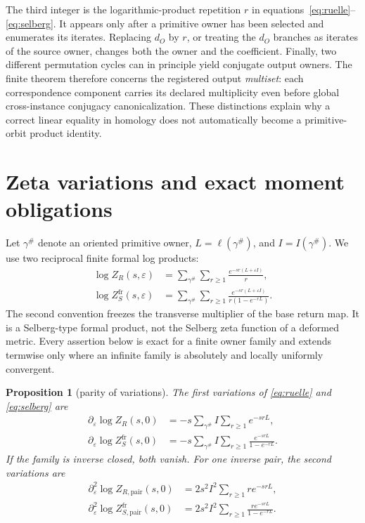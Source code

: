 \documentclass[11pt]{article}
\newtheorem{proposition}[theorem]{Proposition}
\theoremstyle{definition}
\theoremstyle{remark}
\newcommand{\e}{\varepsilon}
\begin{document}
The third integer is the logarithmic-product repetition $r$ in equations~\eqref{eq:ruelle}--\eqref{eq:selberg}. It appears only after a primitive owner has been selected and enumerates its iterates. Replacing $d_O$ by $r$, or treating the $d_O$ branches as iterates of the source owner, changes both the owner and the coefficient. Finally, two different permutation cycles can in principle yield conjugate output owners. The finite theorem therefore concerns the registered output \emph{multiset}: each correspondence component carries its declared multiplicity even before global cross-instance conjugacy canonicalization. These distinctions explain why a correct linear equality in homology does not automatically become a primitive-orbit product identity.

\section{Zeta variations and exact moment obligations}

Let $\gamma^\#$ denote an oriented primitive owner, $L=\ell(\gamma^\#)$, and $I=I(\gamma^\#)$. We use two reciprocal finite formal log products:
\begin{align}
\log Z_R(s,\e)
&=\sum_{\gamma^\#}\sum_{r\geq1}\frac{e^{-sr(L+\e I)}}r,\label{eq:ruelle}\\
\log Z_S^{\mathrm{fr}}(s,\e)
&=\sum_{\gamma^\#}\sum_{r\geq1}
\frac{e^{-sr(L+\e I)}}{r(1-e^{-rL})}.\label{eq:selberg}
\end{align}
The second convention freezes the transverse multiplier of the base return map. It is a Selberg-type formal product, not the Selberg zeta function of a deformed metric. Every assertion below is exact for a finite owner family and extends termwise only where an infinite family is absolutely and locally uniformly convergent.

\begin{proposition}[parity of variations]\label{prop:variations}
The first variations of \eqref{eq:ruelle} and \eqref{eq:selberg} are
\begin{align*}
\partial_\e\log Z_R(s,0)&=-s\sum_{\gamma^\#}I\sum_{r\geq1}e^{-srL},\\
\partial_\e\log Z_S^{\mathrm{fr}}(s,0)&=-s\sum_{\gamma^\#}I\sum_{r\geq1}\frac{e^{-srL}}{1-e^{-rL}}.
\end{align*}
If the family is inverse closed, both vanish. For one inverse pair, the second variations are
\begin{align*}
\partial_\e^2\log Z_{R,\mathrm{pair}}(s,0)
&=2s^2I^2\sum_{r\geq1}r e^{-srL},\\
\partial_\e^2\log Z_{S,\mathrm{pair}}^{\mathrm{fr}}(s,0)
&=2s^2I^2\sum_{r\geq1}\frac{r e^{-srL}}{1-e^{-rL}}.
\end{align*}
\end{proposition}
\end{document}
